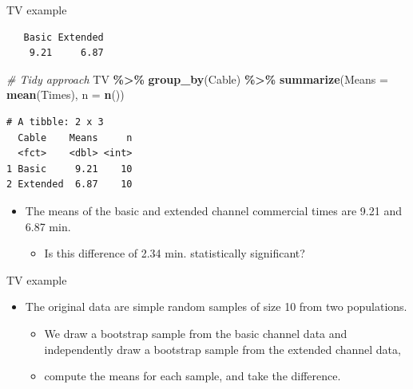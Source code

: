 \documentclass[
  ignorenonframetext,
]{beamer}
\newenvironment{Shaded}{\begin{snugshade}}{\end{snugshade}}
\newcommand{\AttributeTok}[1]{\textcolor[rgb]{0.13,0.29,0.53}{#1}}
\newcommand{\CommentTok}[1]{\textcolor[rgb]{0.56,0.35,0.01}{\textit{#1}}}
\newcommand{\FunctionTok}[1]{\textcolor[rgb]{0.13,0.29,0.53}{\textbf{#1}}}
\newcommand{\NormalTok}[1]{#1}
\newcommand{\OtherTok}[1]{\textcolor[rgb]{0.56,0.35,0.01}{#1}}
\newcommand{\SpecialCharTok}[1]{\textcolor[rgb]{0.81,0.36,0.00}{\textbf{#1}}}
\providecommand{\tightlist}{%
  \setlength{\itemsep}{0pt}\setlength{\parskip}{0pt}}
\begin{document}
\begin{frame}[fragile]{TV example}
\protect\hypertarget{tv-example-1}{}
\small

\begin{Shaded}
\end{Shaded}

\begin{verbatim}
   Basic Extended 
    9.21     6.87 
\end{verbatim}

\begin{Shaded}
\begin{Highlighting}[]
\CommentTok{\# Tidy approach}
\NormalTok{TV }\SpecialCharTok{\%\textgreater{}\%}
  \FunctionTok{group\_by}\NormalTok{(Cable) }\SpecialCharTok{\%\textgreater{}\%}
  \FunctionTok{summarize}\NormalTok{(}\AttributeTok{Means =} \FunctionTok{mean}\NormalTok{(Times), }\AttributeTok{n =} \FunctionTok{n}\NormalTok{())}
\end{Highlighting}
\end{Shaded}

\begin{verbatim}
# A tibble: 2 x 3
  Cable    Means     n
  <fct>    <dbl> <int>
1 Basic     9.21    10
2 Extended  6.87    10
\end{verbatim}

\normalsize

\begin{itemize}
\item
  The means of the basic and extended channel commercial times are 9.21
  and 6.87 min.

  \begin{itemize}
  \tightlist
  \item
    Is this difference of 2.34 min. statistically significant?
  \end{itemize}
\end{itemize}
\end{frame}

\begin{frame}{TV example}
\protect\hypertarget{tv-example-2}{}
\begin{itemize}
\item
  The original data are simple random samples of size 10 from two
  populations.

  \begin{itemize}
  \tightlist
  \item
    We draw a bootstrap sample from the basic channel data and
    independently draw a bootstrap sample from the extended channel
    data,
  \item
    compute the means for each sample, and take the difference.
  \end{itemize}
\end{itemize}
\end{frame}
\end{document}
